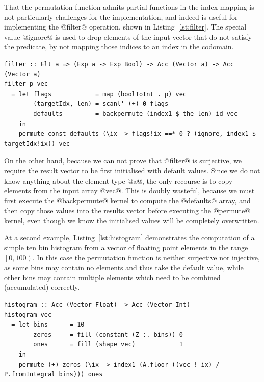 That the permutation function admits partial functions in the index mapping is
not particularly challenges for the implementation, and indeed is useful for
implementing the @filter@ operation, shown in Listing~\ref{lst:filter}. The
special value @ignore@ is used to drop elements of the input vector that do
not satisfy the predicate, by not mapping those indices to an index in the
codomain.
%
\begin{lstlisting}[style=haskell
    ,label=lst:filter
    ,float=t
    ,caption={[Filter in Accelerate] Filtering returns only those elements of a
    vector which satisfy a predicate. This operation is included as part of
    Accelerate's standard prelude.}]
filter :: Elt a => (Exp a -> Exp Bool) -> Acc (Vector a) -> Acc (Vector a)
filter p vec
  = let flags            = map (boolToInt . p) vec
        (targetIdx, len) = scanl' (+) 0 flags
        defaults         = backpermute (index1 $ the len) id vec
    in
    permute const defaults (\ix -> flags!ix ==* 0 ? (ignore, index1 $ targetIdx!ix)) vec
\end{lstlisting}

On the other hand, because we can not prove that @filter@ is surjective, we
require the result vector to be first initialised with default values. Since we
do not know anything about the element type @a@, the only recourse is to
copy elements from the input array @vec@. This is doubly wasteful, because
we must first execute the @backpermute@ kernel to compute the
@defaults@ array, and then copy those values into the results vector before
executing the @permute@ kernel, even though we know the initialised values
will be completely overwritten.

At a second example, Listing~\ref{lst:histogram} demonstrates the computation of
a simple ten bin histogram from a vector of floating point elements in the range
$\left[ 0, 100 \right)$. In this case the permutation function is neither
surjective nor injective, as some bins may contain no elements and thus take the
default value, while other bins may contain multiple elements which need to be
combined (accumulated) correctly.
%
\begin{lstlisting}[style=haskell
    ,label=lst:histogram
    ,float=t
    ,caption={[Simple histogram in Accelerate] A simple histogram written in
    Accelerate. We assume the input vector contains elements in the range
    $\left[0,100\right)$ and accumulate into ten equally sized bins.}]
histogram :: Acc (Vector Float) -> Acc (Vector Int)
histogram vec
  = let bins      = 10
        zeros     = fill (constant (Z :. bins)) 0
        ones      = fill (shape vec)            1
    in
    permute (+) zeros (\ix -> index1 (A.floor ((vec ! ix) / P.fromIntegral bins))) ones
\end{lstlisting}

